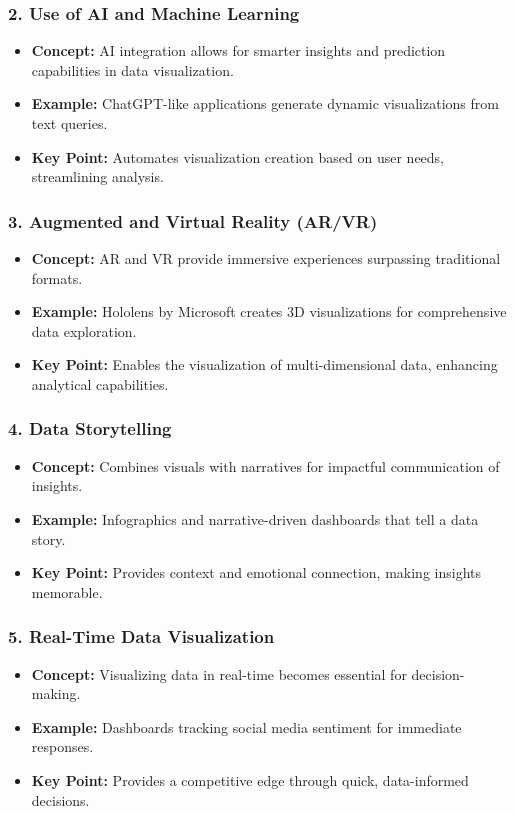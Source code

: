 \documentclass[aspectratio=169]{beamer}
\begin{document}
\begin{frame}[fragile]
    \frametitle{2. Use of AI and Machine Learning}
    \begin{itemize}
        \item \textbf{Concept:} AI integration allows for smarter insights and prediction capabilities in data visualization.
        \item \textbf{Example:} ChatGPT-like applications generate dynamic visualizations from text queries.
        \item \textbf{Key Point:} Automates visualization creation based on user needs, streamlining analysis.
    \end{itemize}
\end{frame}

\begin{frame}[fragile]
    \frametitle{3. Augmented and Virtual Reality (AR/VR)}
    \begin{itemize}
        \item \textbf{Concept:} AR and VR provide immersive experiences surpassing traditional formats.
        \item \textbf{Example:} Hololens by Microsoft creates 3D visualizations for comprehensive data exploration.
        \item \textbf{Key Point:} Enables the visualization of multi-dimensional data, enhancing analytical capabilities.
    \end{itemize}
\end{frame}

\begin{frame}[fragile]
    \frametitle{4. Data Storytelling}
    \begin{itemize}
        \item \textbf{Concept:} Combines visuals with narratives for impactful communication of insights.
        \item \textbf{Example:} Infographics and narrative-driven dashboards that tell a data story.
        \item \textbf{Key Point:} Provides context and emotional connection, making insights memorable.
    \end{itemize}
\end{frame}

\begin{frame}[fragile]
    \frametitle{5. Real-Time Data Visualization}
    \begin{itemize}
        \item \textbf{Concept:} Visualizing data in real-time becomes essential for decision-making.
        \item \textbf{Example:} Dashboards tracking social media sentiment for immediate responses.
        \item \textbf{Key Point:} Provides a competitive edge through quick, data-informed decisions.
    \end{itemize}
\end{frame}
\end{document}
